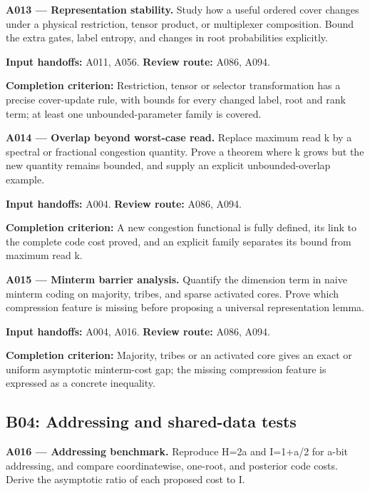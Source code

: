 \documentclass[11pt]{article}
\begin{document}
\textbf{A013 --- Representation stability.} Study how a useful ordered cover changes under a physical restriction, tensor product, or multiplexer composition. Bound the extra gates, label entropy, and changes in root probabilities explicitly.

{\small\color{ink}\textbf{Input handoffs:} A011, A056. \textbf{Review route:} A086, A094.\par
\textbf{Completion criterion:} Restriction, tensor or selector transformation has a precise cover-update rule, with bounds for every changed label, root and rank term; at least one unbounded-parameter family is covered.\par}



\textbf{A014 --- Overlap beyond worst-case read.} Replace maximum read k by a spectral or fractional congestion quantity. Prove a theorem where k grows but the new quantity remains bounded, and supply an explicit unbounded-overlap example.

{\small\color{ink}\textbf{Input handoffs:} A004. \textbf{Review route:} A086, A094.\par
\textbf{Completion criterion:} A new congestion functional is fully defined, its link to the complete code cost proved, and an explicit family separates its bound from maximum read k.\par}



\textbf{A015 --- Minterm barrier analysis.} Quantify the dimension term in naive minterm coding on majority, tribes, and sparse activated cores. Prove which compression feature is missing before proposing a universal representation lemma.

{\small\color{ink}\textbf{Input handoffs:} A004, A016. \textbf{Review route:} A086, A094.\par
\textbf{Completion criterion:} Majority, tribes or an activated core gives an exact or uniform asymptotic minterm-cost gap; the missing compression feature is expressed as a concrete inequality.\par}



\subsection{B04: Addressing and shared-data tests}

\textbf{A016 --- Addressing benchmark.} Reproduce H=2a and I=1+a/2 for a-bit addressing, and compare coordinatewise, one-root, and posterior code costs. Derive the asymptotic ratio of each proposed cost to I.
\end{document}
